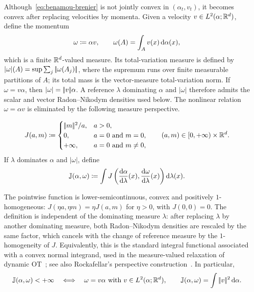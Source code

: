 Although~\eqref{eq:benamou-brenier} is not jointly convex in $(\alpha_t,v_t)$, it becomes convex after replacing velocities by momenta. Given a velocity \(v\in L^2(\alpha;\mathbb{R}^d)\), define the momentum
\[
	\omega\coloneqq \alpha v,
	\qquad
	\omega(A)=\int_A v(x)\,\mathrm{d}\alpha(x),
\]
which is a finite \(\mathbb{R}^d\)-valued measure. Its total-variation measure is defined by $|\omega|(A)=\sup\sum_j|\!| \omega(A_j) |\!|$, where the supremum runs over finite measurable partitions of $A$; its total mass is the vector-measure total-variation norm. If $\omega=v\alpha$, then $|\omega|=|\!| v |\!|\alpha$. A reference $\lambda$ dominating $\alpha$ and $|\omega|$ therefore admits the scalar and vector Radon--Nikodym densities used below. The nonlinear relation \(\omega=\alpha v\) is eliminated by the following measure perspective.
\begin{defn}\label{def-quadratic-perspective-action}
\begin{equation}\label{eq-quadratic-perspective}
	J(a,m)
	\coloneqq
	\begin{cases}
		|\!| m |\!|^2/a, & a>0,\\
		0, & a=0\ \text{and}\ m=0,\\
	+\infty, & a=0\ \text{and}\ m\neq0,
	\end{cases}
	\qquad
	(a,m)\in[0,+\infty)\times\mathbb{R}^d.
\end{equation}
If \(\lambda\) dominates \(\alpha\) and \(|\omega|\), define
\begin{equation}\label{eq-measure-perspective-action}
	\mathbb J(\alpha,\omega)
	\coloneqq
	\int
	J\left(
		\frac{\mathrm{d}\alpha}{\mathrm{d}\lambda}(x),
		\frac{\mathrm{d} \omega}{\mathrm{d}\lambda}(x)
	\right)\mathrm{d}\lambda(x).
\end{equation}
\end{defn}
The pointwise function is lower-semicontinuous, convex and positively \(1\)-homogeneous: \(J(\eta a,\eta m)=\eta J(a,m)\) for \(\eta>0\), with \(J(0,0)=0\).
The definition is independent of the dominating measure \(\lambda\): after replacing \(\lambda\) by another dominating measure, both Radon--Nikodym densities are rescaled by the same factor, which cancels with the change of reference measure by the \(1\)-homogeneity of \(J\). Equivalently, this is the standard integral functional associated with a convex normal integrand, used in the measure-valued relaxation of dynamic OT~\citep{ambrosio2006gradient}; see also Rockafellar's perspective construction~\citep{rockafellar2015convex}. In particular,
\[
	\mathbb J(\alpha,\omega)<+\infty
	\quad\Longleftrightarrow\quad
	\omega=v\alpha\ \text{with}\ v\in L^2(\alpha;\mathbb{R}^d),
	\qquad
	\mathbb J(\alpha,\omega)=\int|\!| v |\!|^2\,\mathrm{d}\alpha.
\]

